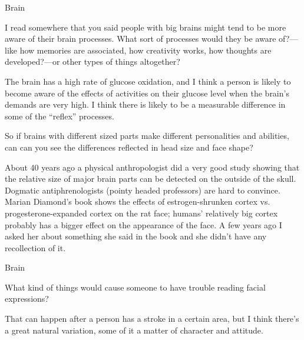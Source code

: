 \documentclass[11pt,oneside,openany,extrafontsizes]{memoir}
\begin{document}
\begin{emailexchange}{Brain}

    \begin{question}
        I read somewhere that you said people with big brains might tend to be more aware of their brain processes. What sort of processes would they be aware of?---like how memories are associated, how creativity works, how thoughts are developed?---or other types of things altogether?
    \end{question}

    \begin{answer}
      The brain has a high rate of glucose oxidation, and I think a person is likely to become aware of the effects of activities on their glucose level when the brain's demands are very high. I think there is likely to be a measurable difference in some of the \enquote{reflex} processes.
    \end{answer}
	
    \begin{question}
        So if brains with different sized parts make different personalities and abilities, can can you see the differences reflected in head size and face shape?
    \end{question}

    \begin{answer}
      About 40 years ago a physical anthropologist did a very good study showing that the relative size of major brain parts can be detected on the outside of the skull. Dogmatic antiphrenologists (pointy headed professors) are hard to convince. Marian Diamond's book shows the effects of estrogen-shrunken cortex vs. progesterone-expanded cortex on the rat face; humans' relatively big cortex probably has a bigger effect on the appearance of the face. A few years ago I asked her about something she said in the book and she didn't have any recollection of it.
    \end{answer}
\end{emailexchange}

\begin{qaexchange}{Brain}

    \begin{question}
        What kind of things would cause someone to have trouble reading facial expressions?
    \end{question}

    \begin{answer}
      That can happen after a person has a stroke in a certain area, but I think there's a great natural variation, some of it a matter of character and attitude.
    \end{answer}
\end{qaexchange}
\end{document}
